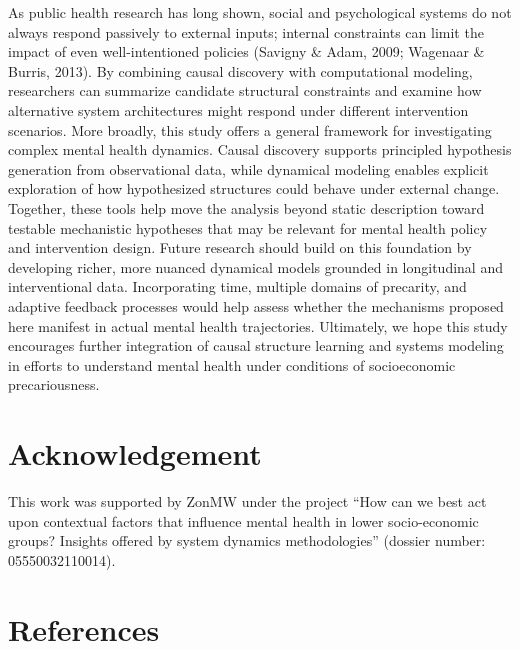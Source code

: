\documentclass[
]{article}
\begin{document}
As public health research has long shown, social and psychological
systems do not always respond passively to external inputs; internal
constraints can limit the impact of even well-intentioned policies
(Savigny \& Adam, 2009; Wagenaar \& Burris, 2013). By combining causal
discovery with computational modeling, researchers can summarize
candidate structural constraints and examine how alternative system
architectures might respond under different intervention scenarios. More
broadly, this study offers a general framework for investigating complex
mental health dynamics. Causal discovery supports principled hypothesis
generation from observational data, while dynamical modeling enables
explicit exploration of how hypothesized structures could behave under
external change. Together, these tools help move the analysis beyond
static description toward testable mechanistic hypotheses that may be
relevant for mental health policy and intervention design. Future
research should build on this foundation by developing richer, more
nuanced dynamical models grounded in longitudinal and interventional
data. Incorporating time, multiple domains of precarity, and adaptive
feedback processes would help assess whether the mechanisms proposed
here manifest in actual mental health trajectories. Ultimately, we hope
this study encourages further integration of causal structure learning
and systems modeling in efforts to understand mental health under
conditions of socioeconomic precariousness.

\section{Acknowledgement}\label{acknowledgement}

This work was supported by ZonMW under the project ``How can we best act
upon contextual factors that influence mental health in lower
socio-economic groups? Insights offered by system dynamics
methodologies'' (dossier number: 05550032110014).

\section{References}\label{references}
\end{document}
